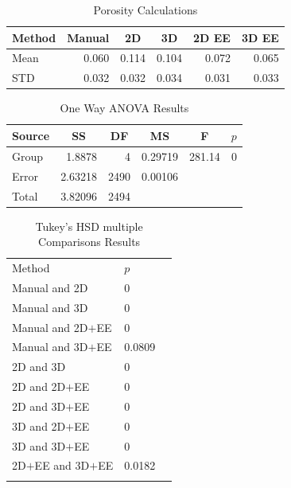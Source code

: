 \documentclass[11pt, twocolumn]{IEEEtran}
\begin{document}
\begin{table}[htbp]
	\centering
	\caption{Porosity Calculations}
	\begin{tabular}{|l|r|r|r|r|r|}
		\toprule
		Method & \multicolumn{1}{c|}{Manual} & \multicolumn{1}{c|}{2D} & \multicolumn{1}{c|}{3D} & \multicolumn{1}{c|}{2D EE} & \multicolumn{1}{c|}{3D EE} \\
		\midrule
		Mean  & 0.060 & 0.114 & 0.104 & 0.072 & 0.065 \\
		\midrule
		STD   & 0.032 & 0.032 & 0.034 & 0.031 & 0.033 \\
		\bottomrule
	\end{tabular}%
	\label{tab:DataTable}%
\end{table}%
\begin{table}[htbp]
	\centering
	\caption{One Way ANOVA Results}
	\begin{tabular}{|lrrrrr|}
		\toprule
		\multicolumn{1}{|c}{Source} & \multicolumn{1}{c}{SS} & \multicolumn{1}{c}{DF} & \multicolumn{1}{c}{MS} & \multicolumn{1}{c}{F} & \multicolumn{1}{c|}{$p$} \\
		\midrule
		Group & 1.8878 & 4     & 0.29719 & 281.14 & 0 \\
		Error & 2.63218 & 2490  & 0.00106 &       &  \\
		Total & 3.82096 & 2494  &       &       &  \\
		\bottomrule
	\end{tabular}%
	\label{tab:OneWay}%
\end{table}%

\begin{table}[htbp]
	\caption{Tukey's HSD multiple Comparisons Results}
	\label{tab:mult}       %
	\begin{tabular}{lll}
		\hline\noalign{\smallskip}
		Method & $p$ \\
		\noalign{\smallskip}\hline\noalign{\smallskip}
		Manual and 2D & 0 \\
		Manual and 3D & 0 \\
		Manual and 2D$+$EE & 0 \\
		Manual and 3D$+$EE & 0.0809 \\
		2D and 3D & 0 \\
		2D and 2D$+$EE & 0 \\
		2D and 3D$+$EE & 0 \\
		3D and 2D$+$EE & 0 \\
		3D and 3D$+$EE & 0 \\
		2D$+$EE and 3D$+$EE & 0.0182 \\
		\noalign{\smallskip}\hline
	\end{tabular}
	\centering
\end{table}
\end{document}
